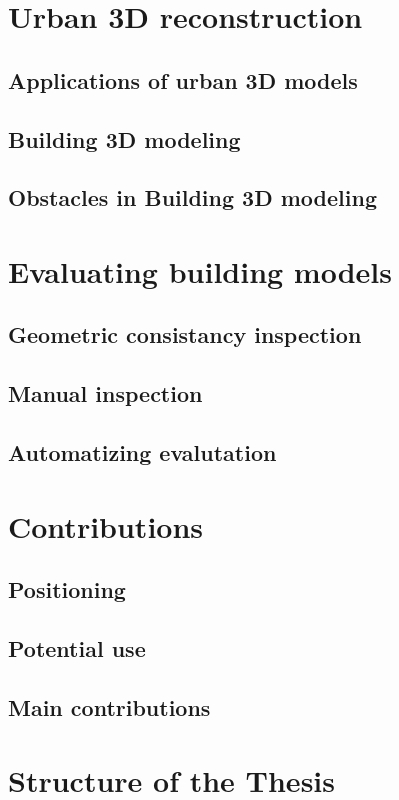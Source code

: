 \minitoc
\section{Urban 3D reconstruction}
    \subsection{Applications of urban 3D models}
    \subsection{Building 3D modeling}
    \subsection{Obstacles in Building 3D modeling}
\section{Evaluating building models}
    \subsection{Geometric consistancy inspection}
    \subsection{Manual inspection}
    \subsection{Automatizing evalutation}
\section{Contributions}
    \subsection{Positioning}
    \subsection{Potential use}
    \subsection{Main contributions}
\section{Structure of the Thesis}
